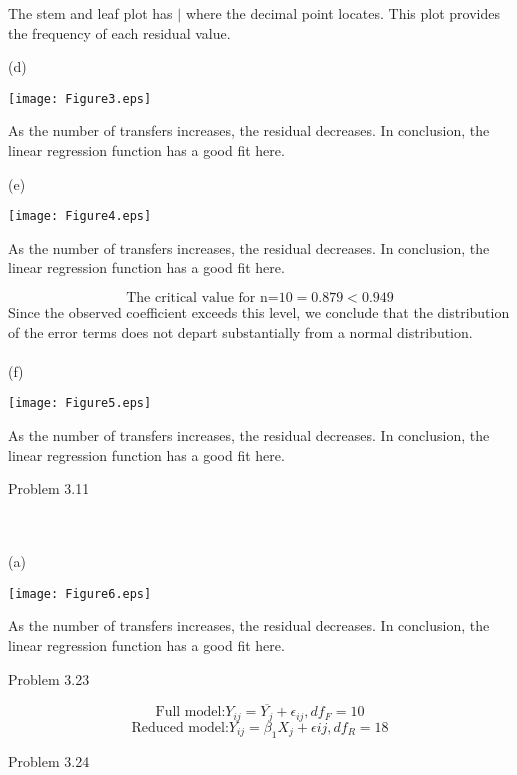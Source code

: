 \documentclass{article}
\begin{document}
 \begin{center}The stem and leaf plot has $|$ where the decimal point locates. This plot provides the frequency of each residual value.\end{center}
 (d)\begin{center}
   \texttt{[image: Figure3.eps]}
   \begin{center}As the number of transfers increases, the residual decreases. In conclusion, the linear regression function has a good fit here.\end{center}\end{center}
   (e)\begin{center}
   \texttt{[image: Figure4.eps]}
   \begin{center}As the number of transfers increases, the residual decreases. In conclusion, the linear regression function has a good fit here.\end{center}\end{center}
\[\text{The critical value for n=10}=0.879<0.949\]
Since the observed coefficient exceeds this level, we conclude that the distribution of the error terms does not depart substantially from a normal distribution.
\\\\(f)\begin{center}
   \texttt{[image: Figure5.eps]}
   \begin{center}As the number of transfers increases, the residual decreases. In conclusion, the linear regression function has a good fit here.\end{center}\end{center}
\begin{large}Problem 3.11\end{large}
\\\\(a)\begin{center}
   \texttt{[image: Figure6.eps]}
   \begin{center}As the number of transfers increases, the residual decreases. In conclusion, the linear regression function has a good fit here.\end{center}\end{center}
\begin{large}Problem 3.23\end{large}
\[\text{Full model:}Y_{ij}=\overline{Y_j}+\epsilon_{ij}, df_F=10\]
\[\text{Reduced model:}Y_{ij}=\beta_1X_j+\epsilon{ij}, df_R=18\]
\begin{large}Problem 3.24\end{large}
\end{document}
